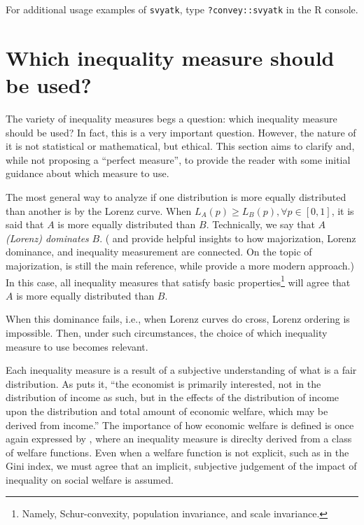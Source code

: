 \documentclass[
]{book}
\begin{document}
For additional usage examples of \texttt{svyatk}, type \texttt{?convey::svyatk} in the R console.

\hypertarget{which-inequality-measure-should-be-used}{%
\section{Which inequality measure should be used?}\label{which-inequality-measure-should-be-used}}

The variety of inequality measures begs a question: which inequality measure should be used? In fact, this is a very important question. However, the nature of it is not statistical or mathematical, but ethical. This section aims to clarify and, while not proposing a ``perfect measure'', to provide the reader with some initial guidance about which measure to use.

The most general way to analyze if one distribution is more equally distributed than another is by the Lorenz curve. When \(L_A(p) \geqslant L_B(p), \forall p \in [0,1]\), it is said that \(A\) is more equally distributed than \(B\). Technically, we say that \(A\) \emph{(Lorenz) dominates} \(B\). (\textcite{kramer1998} and \textcite{mosler1994} provide helpful insights to how majorization, Lorenz dominance, and inequality measurement are connected. On the topic of majorization, \textcite{hardy1934} is still the main reference, while \textcite{olkin2011} provide a more modern approach.) In this case, all inequality measures that satisfy basic properties\footnote{Namely, Schur-convexity, population invariance, and scale invariance.} will agree that \(A\) is more equally distributed than \(B\).

When this dominance fails, i.e., when Lorenz curves do cross, Lorenz ordering is impossible. Then, under such circumstances, the choice of which inequality measure to use becomes relevant.

Each inequality measure is a result of a subjective understanding of what is a fair distribution. As \textcite[p.348]{dalton1920} puts it, ``the economist is primarily interested, not in the distribution of income as such, but in the effects of the distribution of income upon the distribution and total amount of economic welfare, which may be derived from income.'' The importance of how economic welfare is defined is once again expressed by \textcite{atkinson1970}, where an inequality measure is direclty derived from a class of welfare functions. Even when a welfare function is not explicit, such as in the Gini index, we must agree that an implicit, subjective judgement of the impact of inequality on social welfare is assumed.
\end{document}
